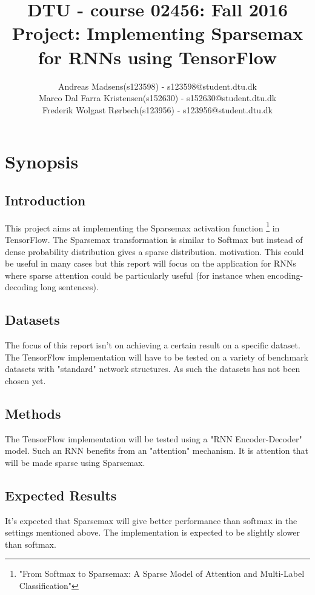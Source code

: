 \documentclass[a4paper]{article}
\title{	
\normalsize{DTU - course 02456: Fall 2016}\\
\Large Project: Implementing Sparsemax for RNNs using TensorFlow
}
\author
{ \normalsize
	Andreas Madsens(s123598) - s123598@student.dtu.dk\\
	Marco Dal Farra Kristensen(s152630) - s152630@student.dtu.dk\\
	Frederik Wolgast Rørbech(s123956) - s123956@student.dtu.dk
} %
\date{} %
\numberwithin{equation}{section}
\numberwithin{figure}{section}
\numberwithin{table}{section}
\begin{document}
\maketitle
\section*{Synopsis}
\subsection*{Introduction}
This project aims at implementing the Sparsemax activation function \footnote{"From Softmax to Sparsemax:
	A Sparse Model of Attention and Multi-Label Classification"} in TensorFlow. The Sparsemax transformation is similar to Softmax but instead of dense probability distribution gives a sparse distribution.  
motivation. This could be useful in many cases but this report will focus on the application for RNNs where sparse attention could be particularly useful (for instance when encoding-decoding long sentences).

\subsection*{Datasets}
The focus of this report isn't on achieving a certain result on a specific dataset. The TensorFlow implementation will have to be tested on a variety of benchmark datasets with "standard" network structures. As such the datasets has not been chosen yet.

\subsection*{Methods}
The TensorFlow implementation will be tested using a "RNN Encoder-Decoder" model. Such an RNN benefits from an "attention" mechanism. It is attention that will be made sparse using Sparsemax.

\subsection*{Expected Results}
It's expected that Sparsemax will give better performance than softmax in the settings mentioned above. The implementation is expected to be slightly slower than softmax.
\end{document}
